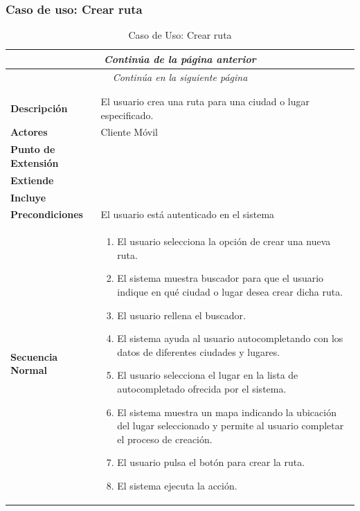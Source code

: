 \subsubsection*{Caso de uso: Crear ruta}
\begin{longtable}{| p{4cm} | p{10cm} |}
\endfirsthead
\multicolumn{2}{c}{\textit{Continúa de la página anterior}}\\[12pt]
\hline
\endhead
\hline
\multicolumn{2}{c}{\textit{Continúa en la siguiente página}} \\
\endfoot
\hline
\caption{Caso de Uso: Crear ruta}\label{fig:1}\\
\endlastfoot


\hline
\multicolumn{2}{|c|}{\textbf{CU$<$03$>$ - Crear Ruta}} \\

\hline
\textbf{Descripción} &
El usuario crea una ruta para una ciudad o lugar especificado. \\

\hline
\textbf{Actores} &
Cliente Móvil\\

\hline
\textbf{Punto de Extensión} &
\\

\hline
\textbf{Extiende} &
\\

\hline
\textbf{Incluye} &
\\

\hline
\textbf{Precondiciones} &
El usuario está autenticado en el sistema\\

\hline
\textbf{Secuencia Normal} &\mbox{}\par\vspace{-\baselineskip}
\begin{enumerate}[leftmargin=0.7cm, topsep=0.1cm]
\item El usuario selecciona la opción de crear una nueva ruta.
\item El sistema muestra buscador para que el usuario indique en qué ciudad o lugar desea crear dicha ruta.
\item El usuario rellena el buscador.
\item El sistema ayuda al usuario autocompletando con los datos de diferentes ciudades y lugares.
\item El usuario selecciona el lugar en la lista de autocompletado ofrecida por el sistema.
\item El sistema muestra un mapa indicando la ubicación del lugar seleccionado y permite al usuario completar el proceso de creación.
\item El usuario pulsa el botón para crear la ruta.
\item El sistema ejecuta la acción.
\end{enumerate}\\


\end{longtable}
